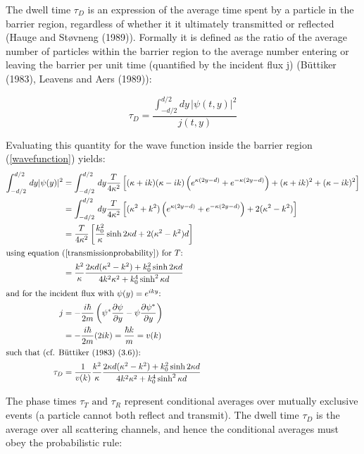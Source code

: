 \documentclass{article}
\begin{document}
The dwell time $\tau_D$ is an expression of the average time spent by a particle in the barrier region, regardless of whether it it ultimately transmitted or reflected (Hauge and St{\o}vneng (1989)). Formally it is defined as the ratio of the average number of particles within the barrier region to the average number entering or leaving the barrier per unit time (quantified by the incident flux j) (B{\"u}ttiker (1983), Leavens and Aers (1989)):

\begin{equation}
	\tau_D = \frac{\int_{-d/2}^{d/2}dy\,|\psi(t,y)|^2}{j(t,y)}
	\label{dwelltimedef}
\end{equation}

\noindent Evaluating this quantity for the wave function inside the barrier region (\ref{wavefunction}) yields:
\begin{subequations}
\begin{align}
	\int_{-d/2}^{d/2}\,dy|\psi(y)|^2&=\int_{-d/2}^{d/2}\,dy\frac{T}{4\kappa^2}\left[(\kappa+ik)(\kappa-ik)\left(e^{\kappa(2y-d)}+e^{-\kappa(2y-d)}\right)+(\kappa+ik)^2+(\kappa-ik)^2\right] \\
		 &= \int_{-d/2}^{d/2}\,dy\frac{T}{4\kappa^2}\left[(\kappa^2+k^2)\left(e^{\kappa(2y-d)}+e^{-\kappa(2y-d)}\right)+2(\kappa^2-k^2)\right] \\
		 &= \frac{T}{4\kappa^2}\left[\frac{k_0^2}{\kappa}\sinh{2\kappa d}+2(\kappa^2-k^2)d\right] \\ \intertext{using equation (\ref{transmissionprobability}) for $T$:}
		 &= \frac{k^2}{\kappa}\frac{2\kappa d(\kappa^2-k^2)+k_0^2\sinh{2\kappa d}}{4k^2\kappa^2+k_0^4\sinh^2{\kappa d}}\\ \intertext{and for the incident flux with $\psi(y) = e^{iky}$:
}
j &= -\frac{i\hbar}{2m}\left(\psi^{*}\frac{\partial\psi}{\partial y}-\psi \frac{\partial \psi^{*}}{\partial y}\right) \label{1dflux}\\ 
  &= -\frac{i\hbar}{2m}(2ik) = \frac{\hbar k}{m} = v(k) \\ \intertext{such that (cf. B{\"u}ttiker (1983) (3.6)):}
	\tau_D &= \frac{1}{v(k)}\frac{k^2}{\kappa}\frac{2\kappa d(\kappa^2-k^2)+k_0^2\sinh{2\kappa d}}{4k^2\kappa^2+k_0^4\sinh^2{\kappa d}}
	\label{dwelltime}
\end{align}
\end{subequations}

\noindent The phase times $\tau_T \text{ and } \tau_R$ represent conditional averages over mutually exclusive events (a particle cannot both reflect and transmit). The dwell time $\tau_D$ is the average over all scattering channels, and hence the conditional averages must obey the probabilistic rule:
\end{document}

